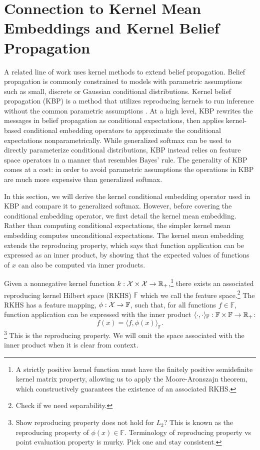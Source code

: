 \documentclass{article}
\begin{document}
\section{Connection to Kernel Mean Embeddings and Kernel Belief Propagation}
A related line of work uses kernel methods to extend belief propagation.
Belief propagation is commonly constrained to models with parametric assumptions such as
small, discrete or Gaussian conditional distributions.
Kernel belief propagation (KBP) is a method that utilizes reproducing kernels
to run inference without the common parametric assumptions \citep{song2010tree,song2011kernelbp}.
At a high level, KBP rewrites the messages in belief propagation as conditional
expectations, then applies kernel-based conditional embedding operators
to approximate the conditional expectations nonparametrically.
While generalized softmax can be used to directly parameterize conditional distributions,
KBP instead relies on feature space operators in a manner that resembles Bayes' rule.
The generality of KBP comes at a cost: in order to avoid parametric assumptions
the operations in KBP are much more expensive than generalized softmax.

In this section, we will derive the kernel conditional embedding operator
used in KBP and compare it to generalized softmax.
However, before covering the conditional embedding operator, we first
detail the kernel mean embedding.
Rather than computing conditional expectations,
the simpler kernel mean embedding computes unconditional expectations.
The kernel mean embedding extends the reproducing property,
which says that function application can be expressed as an inner product,
by showing that the expected values of functions of $x$ can also
be computed via inner products.

Given a nonnegative kernel function $k:\mathcal{X}\times\mathcal{X}\to\mathbb{R}_+$,\footnote{
A strictly positive kernel function must have the finitely positive semidefinite
kernel matrix property, allowing us to apply the Moore-Aronszajn theorem,
which constructively guarantees the existence of an associated RKHS.
}
there exists an associated reproducing kernel Hilbert space (RKHS) $\mathbb{F}$
which we call the feature space.\footnote{
Check if we need separability.
}
The RKHS has a feature mapping, $\phi:\mathcal{X}\to\mathbb{F}$,
such that, for all functions $f\in\mathbb{F}$,
function application can be expressed with the inner product
$\langle\cdot,\cdot\rangle_\mathbb{F}:\mathbb{F}\times\mathbb{F}\to\mathbb{R}_+$:
$$f(x) = \langle f, \phi(x)\rangle_\mathbb{F}.$$
\footnote{
Show reproducing property does not hold for $L_2$?
This is known as the reproducing property of $\phi(x)\in\mathbb{F}$.
Terminology of reproducing property vs point evaluation property is murky.
Pick one and stay consistent.
}
This is the reproducing property.
We will omit the space associated with the inner product when it is clear from context.
\end{document}
